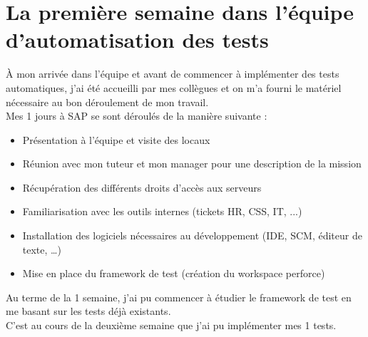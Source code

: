\section{La premi\`{e}re semaine dans l'\'{e}quipe d'automatisation des tests}






\`{A} mon arriv\'{e}e dans l'\'{e}quipe et avant de commencer \`{a} impl\'{e}menter des tests automatiques, j'ai \'{e}t\'{e} accueilli par mes coll\`{e}gues et on m'a fourni le mat\'{e}riel n\'{e}cessaire au bon d\'{e}roulement de mon travail.\\
Mes 1 jours \`{a} SAP se sont d\'{e}roul\'{e}s de la mani\`{e}re suivante :\\
\begin{itemize}
\item Pr\'{e}sentation \`{a} l'\'{e}quipe et visite des locaux
\item R\'{e}union avec mon tuteur et mon manager pour une description de la mission
\item R\'{e}cup\'{e}ration des diff\'{e}rents droits d'acc\`{e}s aux serveurs
\item Familiarisation avec les outils internes (tickets HR, CSS, IT, ...)
\item Installation des logiciels n\'{e}cessaires au d\'{e}veloppement (IDE, SCM, \'{e}diteur de texte, \ldots)
\item Mise en place du framework de test (cr\'{e}ation du workspace perforce)
\end{itemize}
Au terme de la 1 semaine, j'ai pu commencer \`{a} \'{e}tudier le framework de test en me basant sur les tests d\'{e}j\`{a} existants.\\
C'est au cours de la deuxi\`{e}me semaine que j'ai pu impl\'{e}menter mes 1 tests.
